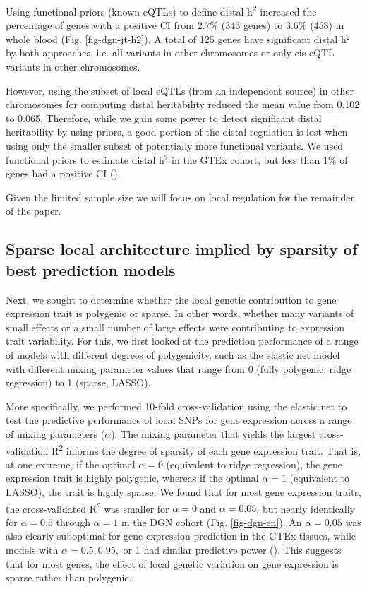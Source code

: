 \documentclass[10pt,letterpaper]{article}
\begin{document}
Using functional priors (known eQTLs) to define distal h\textsuperscript{2} increased the percentage of genes with a positive CI from 2.7\% (343 genes) to 3.6\% (458) in whole blood (Fig. \ref{fig-dgn-jt-h2}). A total of 125 genes have significant distal h$^2$ by both approaches, i.e. all variants in other chromosomes or only cis-eQTL variants in other chromosomes.

However, using the subset of local eQTLs (from an independent source) in other chromosomes for computing distal heritability reduced the mean value from 0.102 to 0.065. Therefore, while we gain some power to detect significant distal heritability by using priors, a good portion of the distal regulation is lost when using only the smaller subset of potentially more functional variants. We used functional priors to estimate distal h$^2$ in the GTEx cohort, but less than 1\% of genes had a positive CI ().

Given the limited sample size we will focus on local regulation for the remainder of the paper.

\subsection*{Sparse local architecture implied by sparsity of best prediction models }\label{the-effect-of-local-genetic-variation-on-gene-expression-is-sparse-rather-than-polygenic}

Next, we sought to determine whether the local genetic contribution to gene expression trait is polygenic or sparse. In other words, whether many variants of small effects or a small number of large effects were contributing to expression trait variability. For this, we first looked at the prediction performance of a range of models with different degrees of polygenicity, such as the elastic net model with different mixing parameter values that range from 0 (fully polygenic, ridge regression) to 1 (sparse, LASSO).

More specifically, we performed 10-fold cross-validation using the elastic net \cite{Zou_2005} to test the predictive performance of local SNPs for gene expression across a range of mixing parameters ($\alpha$). The mixing parameter that yields the largest cross-validation R\textsuperscript{2} informs the degree of sparsity of each gene expression trait. That is, at one extreme, if the optimal \(\alpha=0\) (equivalent to ridge regression), the gene expression trait is highly polygenic, whereas if the optimal \(\alpha=1\) (equivalent to LASSO), the trait is highly sparse. We found that for most gene expression traits, the cross-validated R\textsuperscript{2} was smaller for \(\alpha=0\) and \(\alpha=0.05\), but nearly identically for \(\alpha=0.5\) through \(\alpha=1\) in the DGN cohort (Fig. \ref{fig-dgn-en}). An \(\alpha=0.05\) was also clearly suboptimal for gene expression prediction in the GTEx tissues, while models with \(\alpha=0.5,0.95,\) or 1 had similar predictive power (). This suggests that for most genes, the effect of local genetic variation on gene expression is sparse rather than polygenic.
\end{document}
